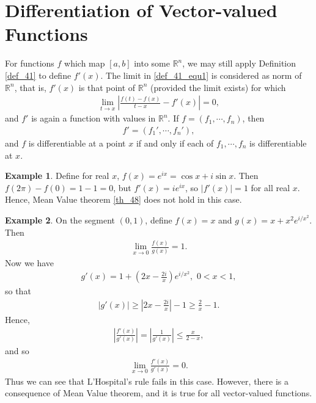 \documentclass[10pt]{book}
\theoremstyle{definition}
\newtheorem{example}{Example}[chapter]
\numberwithin{equation}{chapter}
\begin{document}
\medskip


\section{Differentiation of Vector-valued Functions} 
For functions $f$ which map $[a,b]$ into some $\mathbb{R}^n$, we may still apply Definition \ref{def_41} to define $f'(x)$. The limit in \ref{def_41_equ1} is considered as norm of $\mathbb{R}^n$, that is, $f'(x)$ is that point of $\mathbb{R}^n$ (provided the limit exists) for which \begin{align*}
    \lim_{t \to x} \left|\frac{f(t) - f(x)}{t - x} - f'(x)\right| = 0,
\end{align*}
and $f'$ is again a function with values in $\mathbb{R}^n$. If $f = (f_1, \cdots, f_n)$, then
\begin{align*}
    f' = (f_1', \cdots, f_n'),
\end{align*}
and $f$ is differentiable at a point $x$ if and only if each of $f_1, \cdots, f_n$ is differentiable at $x$.

\medskip

\begin{example}
Define for real $x$, $f(x) = e^{ix} = \cos x + i \sin x$. Then $f(2\pi) - f(0) = 1 - 1 = 0$, but $f'(x) = i e^{ix}$, so $\left|f'(x)\right| = 1$ for all real $x$. Hence, Mean Value theorem \ref{th_48} does not hold in this case.
\end{example}

\medskip

\begin{example}
On the segment $(0,1)$, define $f(x) = x$ and $g(x) = x + x^2 e^{i/x^2}$. Then
\begin{align*}
    \lim_{x \to 0} \frac{f(x)}{g(x)} = 1.
\end{align*}
Now we have
\begin{align*}
    g'(x) = 1 + \left(2x - \frac{2i}{x}\right) e^{i/x^2}, \,\, 0 < x < 1,
\end{align*}
so that
\begin{align*}
    \left|g'(x)\right| \geq \left|2x - \frac{2i}{x}\right| - 1 \geq \frac{2}{x} - 1.
\end{align*}
Hence,
\begin{align*}
    \left|\frac{f'(x)}{g'(x)}\right| = \left| \frac{1}{g'(x)} \right| \leq \frac{x}{2 - x},
\end{align*}
and so
\begin{align*}
    \lim_{x \to 0} \frac{f'(x)}{g'(x)} = 0.
\end{align*}
Thus we can see that L'Hospital's rule fails in this case. However, there is a consequence of Mean Value theorem, and it is true for all vector-valued functions.
\end{example}
\end{document}
